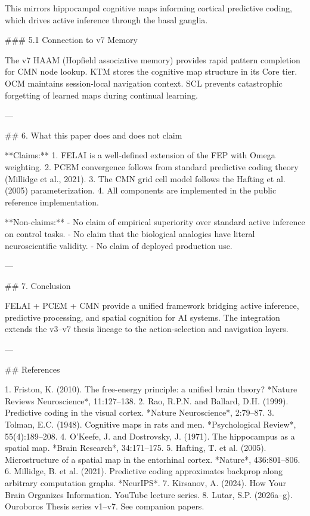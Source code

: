 This mirrors hippocampal cognitive maps informing cortical predictive coding, which drives active inference through the basal ganglia.

### 5.1 Connection to v7 Memory

The v7 HAAM (Hopfield associative memory) provides rapid pattern completion for CMN node lookup. KTM stores the cognitive map structure in its Core tier. OCM maintains session-local navigation context. SCL prevents catastrophic forgetting of learned maps during continual learning.

---

## 6. What this paper does and does not claim

**Claims:**
1. FELAI is a well-defined extension of the FEP with Omega weighting.
2. PCEM convergence follows from standard predictive coding theory (Millidge et al., 2021).
3. The CMN grid cell model follows the Hafting et al. (2005) parameterization.
4. All components are implemented in the public reference implementation.

**Non-claims:**
- No claim of empirical superiority over standard active inference on control tasks.
- No claim that the biological analogies have literal neuroscientific validity.
- No claim of deployed production use.

---

## 7. Conclusion

FELAI + PCEM + CMN provide a unified framework bridging active inference, predictive processing, and spatial cognition for AI systems. The integration extends the v3--v7 thesis lineage to the action-selection and navigation layers.

---

## References

1. Friston, K. (2010). The free-energy principle: a unified brain theory? *Nature Reviews Neuroscience*, 11:127--138.
2. Rao, R.P.N. and Ballard, D.H. (1999). Predictive coding in the visual cortex. *Nature Neuroscience*, 2:79--87.
3. Tolman, E.C. (1948). Cognitive maps in rats and men. *Psychological Review*, 55(4):189--208.
4. O'Keefe, J. and Dostrovsky, J. (1971). The hippocampus as a spatial map. *Brain Research*, 34:171--175.
5. Hafting, T. et al. (2005). Microstructure of a spatial map in the entorhinal cortex. *Nature*, 436:801--806.
6. Millidge, B. et al. (2021). Predictive coding approximates backprop along arbitrary computation graphs. *NeurIPS*.
7. Kirsanov, A. (2024). How Your Brain Organizes Information. YouTube lecture series.
8. Lutar, S.P. (2026a--g). Ouroboros Thesis series v1--v7. See companion papers.
